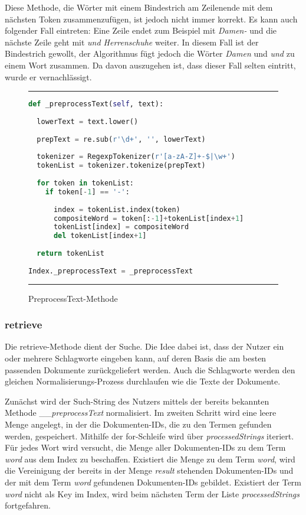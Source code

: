 Diese Methode, die Wörter mit einem Bindestrich am Zeilenende mit dem nächsten Token zusammenzufügen, ist jedoch nicht immer korrekt. Es kann auch folgender Fall eintreten: Eine Zeile endet zum Beispiel mit \textit{Damen-} und die nächste Zeile geht mit \textit{und Herrenschuhe} weiter. In diesem Fall ist der Bindestrich gewollt, der Algorithmus fügt jedoch die Wörter \textit{Damen} und \textit{und} zu einem Wort zusammen. Da davon auszugehen ist, dass dieser Fall selten eintritt, wurde er vernachlässigt.

\begin{figure}[h]
	\rule{\textwidth}{0.4pt}
		\begin{lstlisting}[language=Python]
def _preprocessText(self, text):
    
  lowerText = text.lower()
    
  prepText = re.sub(r'\d+', '', lowerText)
            
  tokenizer = RegexpTokenizer(r'[a-zA-Z]+-$|\w+')
  tokenList = tokenizer.tokenize(prepText)
    
  for token in tokenList:
    if token[-1] == '-':
            
      index = tokenList.index(token)
      compositeWord = token[:-1]+tokenList[index+1]
      tokenList[index] = compositeWord
      del tokenList[index+1]
            
  return tokenList
    
Index._preprocessText = _preprocessText
		\end{lstlisting}
	\rule{\textwidth}{0.4pt}
	\caption{PreprocessText-Methode}
	\label{fig:preprocess}
\end{figure}

\subsubsection{retrieve}\label{retrieve}

Die retrieve-Methode dient der Suche. Die Idee dabei ist, dass der Nutzer ein oder mehrere Schlagworte eingeben kann, auf deren Basis die am besten passenden Dokumente zurückgeliefert werden. Auch die Schlagworte werden den gleichen Normalisierungs-Prozess durchlaufen wie die Texte der Dokumente.

Zunächst wird der Such-String des Nutzers mittels der bereits bekannten Methode \_\_\emph{preprocessText} normalisiert. Im zweiten Schritt wird eine leere Menge angelegt, in der die Dokumenten-IDs, die zu den Termen gefunden werden, gespeichert. Mithilfe der for-Schleife wird über \emph{processedStrings} iteriert. Für jedes Wort wird versucht, die Menge aller Dokumenten-IDs zu dem Term \emph{word} aus dem Index zu beschaffen. Existiert die Menge zu dem Term \emph{word}, wird die Vereinigung der bereits in der Menge \emph{result} stehenden Dokumenten-IDs und der mit dem Term \emph{word} gefundenen Dokumenten-IDs gebildet. Existiert der Term \emph{word} nicht als Key im Index, wird beim nächsten Term der Liste \emph{processedStrings} fortgefahren.

